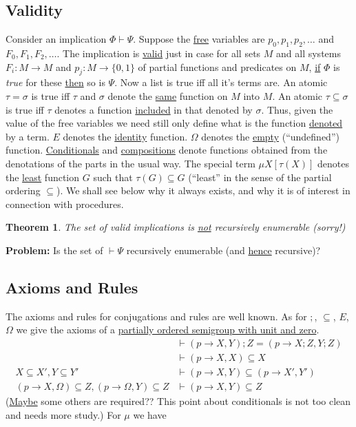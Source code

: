 \documentclass{article}
\newtheorem{theorem}{Theorem}
\begin{document}
\subsection{Validity}
Consider an implication $\Phi \vdash \Psi$. Suppose the \underline{free} variables are $p_0, p_1, p_2, \ldots$ and $F_0, F_1, F_2, \ldots$. The implication is \underline{valid} just in case for all sets $M$ and all systems $F_i : M \to M$ and $p_j : M \to \{0,1\}$ of partial functions and predicates on $M$, \underline{if} $\Phi$ is \textit{true} for these \underline{then} so is $\Psi$. Now a list is true iff all it's terms are. An atomic $\tau = \sigma$ is true iff $\tau$ and $\sigma$ denote the \underline{same} function on $M$ into $M$. An atomic $\tau \subseteq \sigma$ is true iff $\tau$ denotes a function \underline{included} in that denoted by $\sigma$. Thus, given the value of the free variables we need still only define what is the function \underline{denoted} by a term. $E$ denotes the \underline{identity} function. $\Omega$ denotes the \underline{empty} (``undefined'') function. \underline{Conditionals} and \underline{compositions} denote functions obtained from the denotations of the parts in the usual way. The special term $\mu X[\tau(X)]$ denotes the \underline{least} function $G$ such that $\tau(G) \subseteq G$ (``least'' in the sense of the partial ordering $\subseteq$). We shall see below why it always exists, and why it is of interest in connection with procedures. 

\begin{theorem}
    The set of valid implications is \underline{not} recursively enumerable (sorry!)
\end{theorem}

\noindent\textbf{Problem:} Is the set of $\vdash \Psi$ recursively enumerable (and \underline{hence} recursive)?

\subsection{Axioms and Rules} The axioms and rules for conjugations and rules are well known. As for $;$, $\subseteq$, $E$, $\Omega$ we give the axioms of a \underline{partially ordered semigroup with unit and zero}. 
\begin{align*} 
    & \vdash (p \to X, Y); Z = (p \to X; Z, Y; Z) \\
    & \vdash (p \to X, X) \subseteq X \\ 
    X \subseteq X', Y \subseteq Y' & \vdash (p \to X, Y) \subseteq (p \to X', Y') \\
    (p \to X, \Omega) \subseteq Z, (p \to \Omega, Y) \subseteq Z & \vdash (p \to X, Y) \subseteq Z
\end{align*} 
(\underline{Maybe} some others are required?? This point about conditionals is not too clean and needs more study.) For $\mu$ we have
\end{document}

